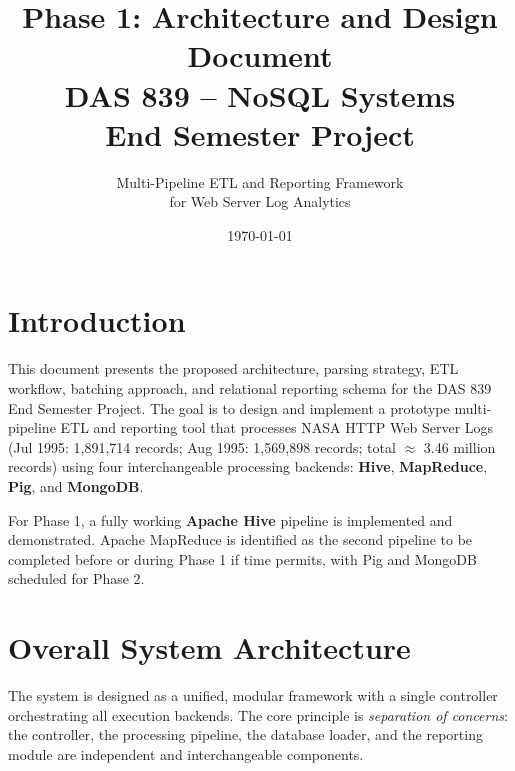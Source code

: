 \documentclass[12pt,a4paper]{article}
\title{\textbf{Phase 1: Architecture and Design Document}\\DAS 839 -- NoSQL Systems\\End Semester Project}
\author{Multi-Pipeline ETL and Reporting Framework\\for Web Server Log Analytics}
\date{\today}
\begin{document}
\maketitle

\tableofcontents
\newpage

\section{Introduction}
This document presents the proposed architecture, parsing strategy, ETL workflow, batching approach, and relational reporting schema for the DAS 839 End Semester Project. The goal is to design and implement a prototype multi-pipeline ETL and reporting tool that processes NASA HTTP Web Server Logs (Jul 1995: 1,891,714 records; Aug 1995: 1,569,898 records; total $\approx$ 3.46 million records) using four interchangeable processing backends: \textbf{Hive}, \textbf{MapReduce}, \textbf{Pig}, and \textbf{MongoDB}.

For Phase 1, a fully working \textbf{Apache Hive} pipeline is implemented and demonstrated. Apache MapReduce is identified as the second pipeline to be completed before or during Phase 1 if time permits, with Pig and MongoDB scheduled for Phase 2.

\section{Overall System Architecture}
The system is designed as a unified, modular framework with a single controller orchestrating all execution backends. The core principle is \emph{separation of concerns}: the controller, the processing pipeline, the database loader, and the reporting module are independent and interchangeable components.
\end{document}
